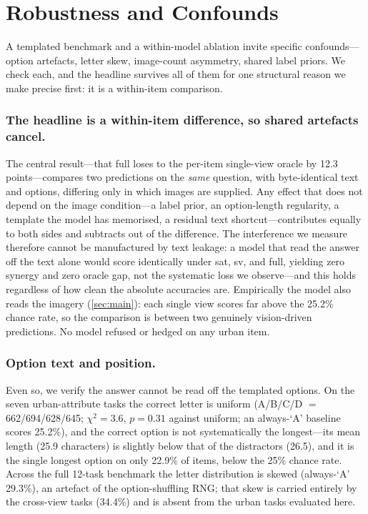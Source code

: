 \section{Robustness and Confounds}
\label{sec:robustness}

A templated benchmark and a within-model ablation invite specific confounds---option
artefacts, letter skew, image-count asymmetry, shared label priors. We check each, and
the headline survives all of them for one structural reason we make precise first: it
is a within-item comparison.

\subsubsection{The headline is a within-item difference, so shared artefacts cancel.}
The central result---that \textsf{full} loses to the per-item single-view oracle by
\num{12.3} points---compares two predictions on the \emph{same} question, with
byte-identical text and options, differing only in which images are supplied. Any
effect that does not depend on the image condition---a label prior, an option-length
regularity, a template the model has memorised, a residual text shortcut---contributes
equally to both sides and subtracts out of the difference. The interference we measure
therefore cannot be manufactured by text leakage: a model that read the answer off the
text alone would score identically under \textsf{sat}, \textsf{sv}, and \textsf{full},
yielding zero synergy and zero oracle gap, not the systematic loss we observe---and
this holds regardless of how clean the absolute accuracies are. Empirically the model
also reads the imagery (\cref{sec:main}): each single view scores far above the
\num{25.2}\% chance rate, so the comparison is between two genuinely vision-driven
predictions. No model refused or
hedged on any urban item.

\subsubsection{Option text and position.}
Even so, we verify the answer cannot be read off the templated options. On the seven
urban-attribute tasks the correct letter is uniform (A/B/C/D $=$
\num{662}/\num{694}/\num{628}/\num{645}; $\chi^2=\num{3.6}$, $p=\num{0.31}$ against
uniform; an always-`A' baseline scores \num{25.2}\%), and the correct option is not
systematically the longest---its mean length (\num{25.9} characters) is slightly below
that of the distractors (\num{26.5}), and it is the single longest option on only
\num{22.9}\% of items, below the \num{25}\% chance rate. Across the full
\num{12}-task benchmark the letter distribution is skewed (always-`A' \num{29.3}\%),
an artefact of the option-shuffling RNG; that skew is carried entirely by the
cross-view tasks (\num{34.4}\%) and is absent from the urban tasks evaluated here.

